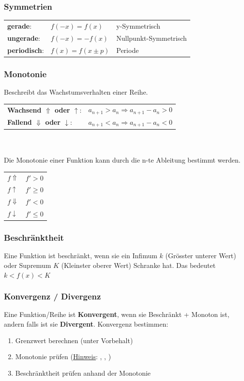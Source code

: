\subsubsection{Symmetrien}
\begin{tabular}{lll}
	\textbf{gerade}:& $f(-x) = f(x)$ & y-Symmetrisch\\
	\textbf{ungerade}:& $f(-x) = -f(x)$ & Nullpunkt-Symmetrisch\\
	\textbf{periodisch}:& $f(x) = f(x \pm p)$& Periode \\
\end{tabular}

\subsubsection{Monotonie}
Beschreibt das Wachstumsverhalten einer Reihe.\\
\noindent
\begin{tabular}{ll}
	\textbf{Wachsend $\Uparrow$ oder $\uparrow$}:& $a_{n+1} > a_n \Rightarrow a_{n+1} - a_n > 0$\\
	\textbf{Fallend $\Downarrow$ oder $\downarrow$}:& $a_{n+1} < a_n \Rightarrow a_{n+1} - a_n < 0$\\
\end{tabular}\\ \\

\noindent Die Monotonie einer Funktion kann durch die n-te Ableitung bestimmt werden.\\
\noindent\begin{tabular}{ll}
	$f \Uparrow$ & $f' > 0$\\
	$f \uparrow$ & $f' \geq 0$\\
	$f \Downarrow$ & $f' < 0$\\
	$f \downarrow$ & $f' \leq 0$\\
\end{tabular}

\subsubsection{Beschränktheit}
Eine Funktion ist beschränkt, wenn sie ein Infimum $k$ (Grösster unterer Wert) oder Supremum $K$ (Kleinster oberer Wert) Schranke hat. Das bedeutet $k < f(x) < K$

\subsubsection{Konvergenz / Divergenz}
Eine Funktion/Reihe ist \textbf{Konvergent}, wenn sie Beschränkt + Monoton ist, andern falls ist sie \textbf{Divergent}.
Konvergenz bestimmen:
\begin{enumerate}[nosep]
	\item Grenzwert berechnen (unter Vorbehalt)
	\item Monotonie prüfen (\underline{Hinweis}: , , )
	\item Beschränktheit prüfen anhand der Monotonie
\end{enumerate}

